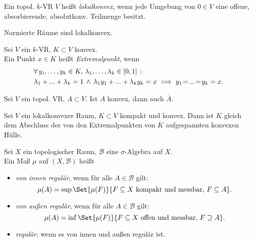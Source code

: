 \documentclass{cheat-sheet}
\newcommand{\clos}[1]{\overline{#1}} %
\newcommand{\Bor}{\mathcal{B}} %
\begin{document}
\begin{defn}
  Ein topol. $k$-VR $V$ heißt \emph{lokalkonvex}, wenn jede Umgebung von $0 \!\in\! V$ eine offene, absorbierende, absolutkonv. Teilmenge besitzt.
\end{defn}

\begin{bsp}
  Normierte Räume sind lokalkonvex.
\end{bsp}

\begin{defn}
  Sei $V$ ein $k$-VR, $K \subset V$ konvex. \\
  Ein Punkt $x \in K$ heißt \emph{Extremalpunkt}, wenn
  \begin{align*}
    & \forall \, {y_i, \ldots, y_k \in K, \, \lambda_1, \ldots, \lambda_k \in \left[ 0, 1 \right]} \,:\, \\
    & \lambda_1 + ... + \lambda_k = 1 \,\wedge\, \lambda_1 y_1 + ... + \lambda_k y_k = x \implies y_1 \!=\! ... \!=\! y_k = x.
  \end{align*}
\end{defn}

\begin{lem}
  Sei $V$ ein topol. VR, $A \subset V$. Ist $A$ konvex, dann auch $\clos{A}$.
\end{lem}

\begin{satz}
  Sei $V$ ein lokalkonvexer Raum, $K \subset V$ kompakt und konvex. Dann ist $K$ gleich dem Abschluss der von den Extremalpunkten von $K$ aufgespannten konvexen Hülle.
\end{satz}

\begin{defn}
  Sei $X$ ein topologischer Raum, $\Bor$ eine $\sigma$-Algebra auf $X$. \\
  Ein Maß $\mu$ auf $(X, \Bor)$ heißt
  \begin{itemize}
    \item \emph{von innen regulär}, wenn für alle $A \in \Bor$ gilt:
    \[ \mu(A) = \sup \Set{\mu(F)}{F \subseteq X \text{ kompakt und messbar, } F \subseteq A}. \]
    \item \emph{von außen regulär}, wenn für alle $A \in \Bor$ gilt:
    \[ \mu(A) = \inf \Set{\mu(F)}{F \subseteq X \text{ offen und messbar, } F \supseteq A}. \]
    \item \emph{regulär}, wenn es von innen und außen regulär ist.
  \end{itemize}
\end{defn}
\end{document}

